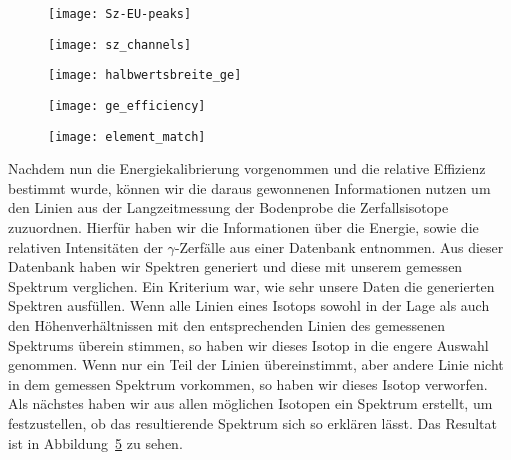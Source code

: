 \documentclass[11pt, ngerman, fleqn, DIV=15, headinclude, BCOR=2cm]{scrreprt}
\newcommand{\plotwidth}{0.8\linewidth}
\begin{document}
\begin{figure}
    \centering
    \texttt{[image: Sz-EU-peaks]}
    \caption{%
    }
    \label{fig:}
\end{figure}

\begin{figure}
    \centering
    \texttt{[image: sz\_channels]}
    \caption{%
    }
    \label{fig:sz_kanal}
\end{figure}


\begin{figure}
    \centering
    \texttt{[image: halbwertsbreite\_ge]}
    \caption{%
    }
    \label{fig:halbwertsbreite}
\end{figure}


\begin{figure}
    \centering
    \texttt{[image: ge\_efficiency]}
    \caption{%
    }
    \label{fig:effizienz}
\end{figure}

\clearpage

\begin{figure}
    \centering
    \texttt{[image: element\_match]}
    \caption{%
    }
    \label{fig:element_match}
\end{figure}

Nachdem nun die Energiekalibrierung vorgenommen und die relative
Effizienz bestimmt wurde, können wir die daraus gewonnenen Informationen nutzen
um den Linien aus der Langzeitmessung der Bodenprobe die Zerfallsisotope
zuzuordnen.
Hierfür haben wir die Informationen über die Energie, sowie die relativen
Intensitäten der $\gamma$-Zerfälle aus einer Datenbank
\parencite{IAEA-gamma-ray-database} entnommen.
Aus dieser Datenbank haben wir Spektren generiert und diese mit unserem gemessen
Spektrum verglichen.
Ein Kriterium war, wie sehr unsere Daten die generierten Spektren
ausfüllen. Wenn alle Linien eines Isotops sowohl in der Lage als auch den
Höhenverhältnissen
mit den entsprechenden Linien des gemessenen Spektrums überein stimmen, so haben
wir dieses Isotop in die engere Auswahl genommen. Wenn nur ein Teil der Linien
übereinstimmt, aber andere Linie nicht in dem gemessen Spektrum vorkommen, so
haben wir dieses Isotop verworfen.
Als nächstes haben wir aus allen möglichen Isotopen ein Spektrum erstellt, um
festzustellen, ob das resultierende Spektrum sich so erklären lässt.
Das Resultat ist in Abbildung~\ref{fig:element_match} zu sehen.
\end{document}
